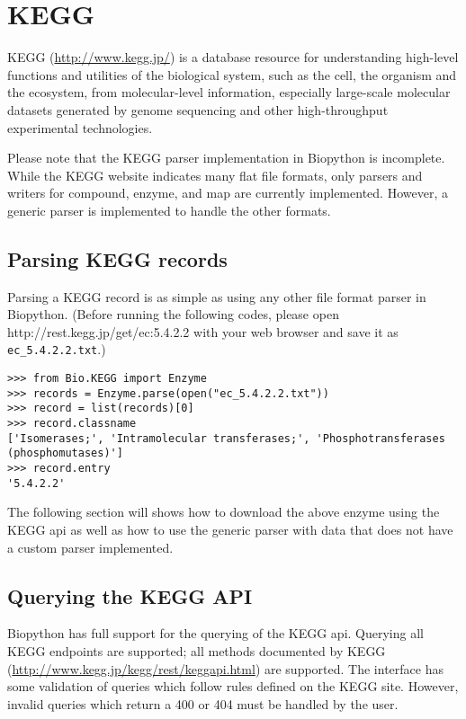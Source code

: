\chapter{KEGG}
\label{chap:kegg}

KEGG (\url{http://www.kegg.jp/}) is a database resource for understanding high-level functions and utilities of the biological system, such as the cell, the organism and the ecosystem, from molecular-level information, especially large-scale molecular datasets generated by genome sequencing and other high-throughput experimental technologies.

Please note that the KEGG parser implementation in Biopython is incomplete. While the KEGG website indicates many flat file formats, only parsers and writers for compound, enzyme, and map are currently implemented. However, a generic parser is implemented to handle the other formats.

\section{Parsing KEGG records}
Parsing a KEGG record is as simple as using any other file format parser in Biopython. 
(Before running the following codes, please open http://rest.kegg.jp/get/ec:5.4.2.2 with your web browser and save it as \verb|ec_5.4.2.2.txt|.)

\begin{verbatim}
>>> from Bio.KEGG import Enzyme
>>> records = Enzyme.parse(open("ec_5.4.2.2.txt"))
>>> record = list(records)[0]
>>> record.classname
['Isomerases;', 'Intramolecular transferases;', 'Phosphotransferases (phosphomutases)']
>>> record.entry
'5.4.2.2'
\end{verbatim}

The following section will shows how to download the above enzyme using the KEGG api as well as how to use the generic parser with data that does not have a custom parser implemented.

\section{Querying the KEGG API}

Biopython has full support for the querying of the KEGG api. Querying all KEGG endpoints are supported; all methods documented by KEGG (\url{http://www.kegg.jp/kegg/rest/keggapi.html}) are supported. The interface has some validation of queries which follow rules defined on the KEGG site. However, invalid queries which return a 400 or 404 must be handled by the user.

